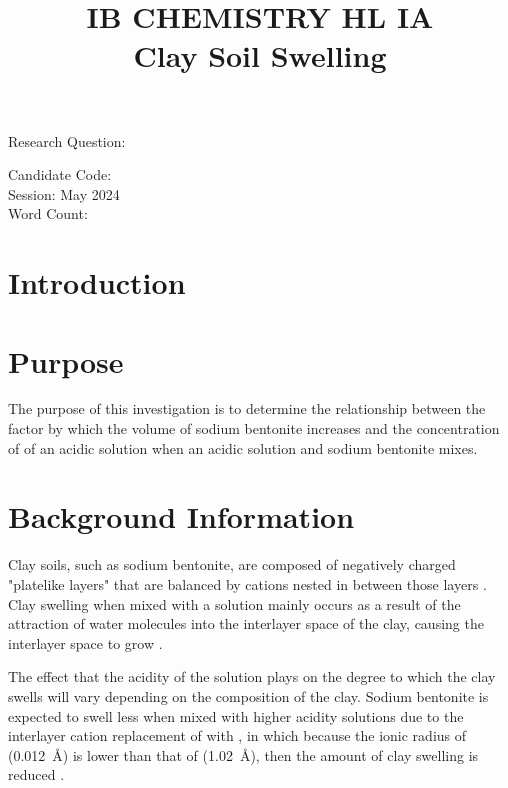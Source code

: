 \documentclass[11pt, letterpaper]{article}
\title{IB CHEMISTRY HL IA
\\
Clay Soil Swelling}
\author{}
\date{}
\begin{document}
\nocite{*}

\maketitle

\begin{center}
    Research Question:
    \\
\end{center}

\begin{center}
    Candidate Code:
    \\
    Session: May 2024
    \\
    Word Count:
\end{center}
\newpage

\tableofcontents
\newpage


\section{Introduction}

\section{Purpose}

The purpose of this investigation is to determine the relationship between
the factor by which the volume of
sodium bentonite increases and the concentration of  of an acidic solution when an acidic solution and sodium bentonite
mixes.

\section{Background Information}

Clay soils, such as sodium bentonite, are composed of negatively charged
"platelike layers" that are balanced by cations nested in between
those layers \cite{chenClaySwellingRole2022}. Clay swelling when mixed with a solution mainly occurs
as a result of the attraction of water molecules into the interlayer space
of the clay, causing the interlayer space to grow \cite{chenClaySwellingRole2022}.

The effect that the acidity of the solution plays on the degree to which
the clay swells will vary depending on the composition of the clay.
Sodium bentonite is expected to swell less when mixed with higher acidity
solutions due to the interlayer cation replacement
of  with , in which because the
ionic radius of  (\SI{0.012}{\angstrom})
is lower than that of  (\SI{1.02}{\angstrom}),
then the amount of clay swelling is reduced \cite{ramavaraprasadSwellingCharacteristicsSoils2018a}.
\end{document}

